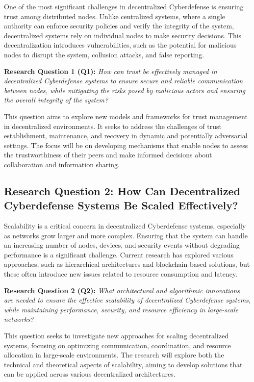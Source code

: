One of the most significant challenges in decentralized Cyberdefense is ensuring trust among distributed nodes. Unlike centralized systems, where a single authority can enforce security policies and verify the integrity of the system, decentralized systems rely on individual nodes to make security decisions. This decentralization introduces vulnerabilities, such as the potential for malicious nodes to disrupt the system, collusion attacks, and false reporting.

\textbf{Research Question 1 (Q1):} \textit{How can trust be effectively managed in decentralized Cyberdefense systems to ensure secure and reliable communication between nodes, while mitigating the risks posed by malicious actors and ensuring the overall integrity of the system?}

This question aims to explore new models and frameworks for trust management in decentralized environments. It seeks to address the challenges of trust establishment, maintenance, and recovery in dynamic and potentially adversarial settings. The focus will be on developing mechanisms that enable nodes to assess the trustworthiness of their peers and make informed decisions about collaboration and information sharing.

\subsection{Research Question 2: How Can Decentralized Cyberdefense Systems Be Scaled Effectively?}

Scalability is a critical concern in decentralized Cyberdefense systems, especially as networks grow larger and more complex. Ensuring that the system can handle an increasing number of nodes, devices, and security events without degrading performance is a significant challenge. Current research has explored various approaches, such as hierarchical architectures and blockchain-based solutions, but these often introduce new issues related to resource consumption and latency.

\textbf{Research Question 2 (Q2):} \textit{What architectural and algorithmic innovations are needed to ensure the effective scalability of decentralized Cyberdefense systems, while maintaining performance, security, and resource efficiency in large-scale networks?}

This question seeks to investigate new approaches for scaling decentralized systems, focusing on optimizing communication, coordination, and resource allocation in large-scale environments. The research will explore both the technical and theoretical aspects of scalability, aiming to develop solutions that can be applied across various decentralized architectures.

